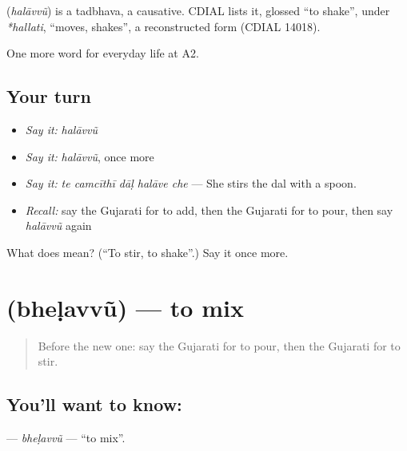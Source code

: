 \begin{cousinweb}
\textbf{} (\emph{halāvvũ}) is a tadbhava, a causative. CDIAL lists it, glossed \textquotedblleft{}to shake\textquotedblright{}, under \emph{*hallati}, \textquotedblleft{}moves, shakes\textquotedblright{}, a reconstructed form (CDIAL 14018).
\end{cousinweb}

\begin{grammarlens}[title={What you've built}]
One more word for everyday life at A2.
\end{grammarlens}

\subsection*{Your turn}
\begin{itemize}
\raggedright
  \item \emph{Say it:} \emph{halāvvũ}
  \item \emph{Say it:} \emph{halāvvũ}, once more
  \item \emph{Say it:} \emph{te camcīthī dāḷ halāve che} — She stirs the dal with a spoon.
  \item \emph{Recall:} say the Gujarati for to add, then the Gujarati for to pour, then say \emph{halāvvũ} again
\end{itemize}

\begin{tcolorbox}[breakable,colback=teal!4,colframe=teal!35!black,title={Before you move on}]
What does  mean? (\textquotedblleft{}To stir, to shake\textquotedblright{}.) Say it once more.
\end{tcolorbox}
\section[\texorpdfstring{\gu{ભેળવવું} (bheḷavvũ)}{ભેળવવું (bheḷavvũ)}]{ (bheḷavvũ) — to mix}

\label{lesson:GU-C165-bhelavvu}



\begin{quote}
Before the new one: say the Gujarati for to pour, then the Gujarati for to stir.
\end{quote}

\subsection*{You'll want to know: }
\textbf{} — \emph{bheḷavvũ} — \textquotedblleft{}to mix\textquotedblright{}.

